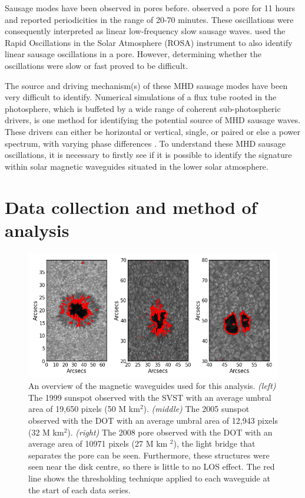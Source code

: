 	Sausage modes have been observed in pores before.
	\citet{doretala2008} observed a pore for 11 hours and reported periodicities in the range of 20-70 minutes.
	These oscillations were consequently interpreted as linear low-frequency slow sausage waves.
	\citet{morton2011} used the Rapid Oscillations in the Solar Atmosphere (ROSA) instrument to also identify linear sausage oscillations in a pore.
	However, determining whether the oscillations were slow or fast proved to be difficult.

	The source and driving mechanism(s) of these MHD sausage modes have been very difficult to identify.
	Numerical simulations of a flux tube rooted in the photosphere, which is buffeted by a wide range of coherent sub-photospheric drivers, is one method for identifying the potential source of MHD sausage waves.
	These drivers can either be horizontal or vertical, single, or paired or else a power spectrum, with varying phase differences \citep[see e.g.][]{malins,khomenko,fedun2,fedun1,Vigeesh2012}.
	To understand these MHD sausage oscillations, it is necessary to firstly see if it is possible to identify the signature within solar magnetic waveguides situated in the lower solar atmosphere.
	
\section{Data collection and method of analysis}

	\begin{figure}
        
		\centering
		\includegraphics[width=\textwidth]{overview.png}
		\caption{
		An overview of the magnetic waveguides used for this analysis.
		\textit{(left)} The 1999 sunspot observed with the SVST with an average umbral area of 19,650 pixels (50 M km$^{2}$).
		\textit{(middle)} The 2005 sunspot observed with the DOT with an average umbral area of 12,943 pixels (32 M km$^{2}$).
		\textit{(right)} The 2008 pore observed with the DOT with an average area of 10971 pixels (27 M km $^{2}$), the light bridge that separates the pore can be seen.
		Furthermore, these structures were seen near the disk centre, so there is little to no LOS effect.
		The red line shows the thresholding technique applied to each waveguide at the start of each data series.}
		\label{images}
	\end{figure}

